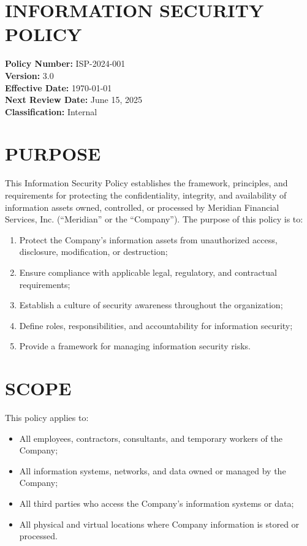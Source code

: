 \documentclass[
    language=english,
    doctype=policy-document,
    institution=none,
]{../../omnilatex}
\begin{document}
\maketitle

\section*{INFORMATION SECURITY POLICY}

\textbf{Policy Number:} ISP-2024-001\\
\textbf{Version:} 3.0\\
\textbf{Effective Date:} \today\\
\textbf{Next Review Date:} June 15, 2025\\
\textbf{Classification:} Internal

\section{PURPOSE}

This Information Security Policy establishes the framework, principles, and requirements for protecting the confidentiality, integrity, and availability of information assets owned, controlled, or processed by Meridian Financial Services, Inc. (``Meridian'' or the ``Company''). The purpose of this policy is to:

\begin{enumerate}
    \item Protect the Company's information assets from unauthorized access, disclosure, modification, or destruction;
    \item Ensure compliance with applicable legal, regulatory, and contractual requirements;
    \item Establish a culture of security awareness throughout the organization;
    \item Define roles, responsibilities, and accountability for information security;
    \item Provide a framework for managing information security risks.
\end{enumerate}

\section{SCOPE}

This policy applies to:
\begin{itemize}
    \item All employees, contractors, consultants, and temporary workers of the Company;
    \item All information systems, networks, and data owned or managed by the Company;
    \item All third parties who access the Company's information systems or data;
    \item All physical and virtual locations where Company information is stored or processed.
\end{itemize}
\end{document}
